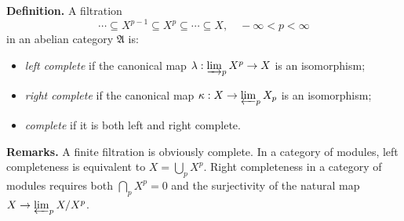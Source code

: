 \textbf{Definition.} A filtration
$$
\cdots \subseteq X^{p-1} \subseteq X^p \subseteq \cdots \subseteq X, \quad -\infty < p < \infty
$$
in an abelian category $\mathfrak{A}$ is:
\begin{itemize}
\item \textit{left complete} if the canonical map $\lambda : \varinjlim_p X^p \to X$ is an isomorphism;
\item \textit{right complete} if the canonical map $\kappa : X \to \varprojlim_p X_p$ is an isomorphism;
\item \textit{complete} if it is both left and right complete.
\end{itemize}

\textbf{Remarks.} A finite filtration is obviously complete. In a category of modules, left completeness is equivalent to $X = \bigcup_p X^p$. Right completeness in a category of modules requires both $\bigcap_p X^p = 0$ and the surjectivity of the natural map $X \to \varprojlim_p X / X^p$.
